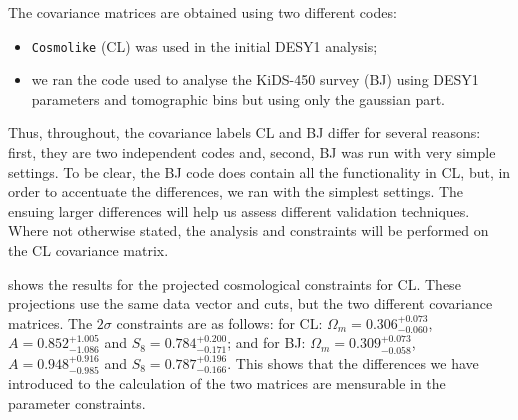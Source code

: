 \documentclass[twocolumn]{\docclass}
\newcommand\scott[1]{{\bf [Scott: #1]}}
\begin{document}
	The covariance matrices are obtained using two different codes: 
	\begin{itemize}
		\item {\tt Cosmolike} \citep{Krause:2016jvl} (CL) was used in the initial DESY1 analysis;
		\item we ran the code used to analyse the KiDS-450 survey \citep{Kohlinger:2017sxk} (BJ) using DESY1 parameters and tomographic bins but using only the gaussian part. 
	\end{itemize}
	Thus, throughout, the covariance labels CL and BJ differ for several reasons: first, they are two independent codes and, second, BJ was run with very simple settings. To be clear, the BJ code does contain all the functionality in CL, but, in order to accentuate the differences, we ran with the simplest settings. The ensuing larger differences will help us assess different validation techniques. Where not otherwise stated, the analysis and constraints will be performed on the CL covariance matrix.
	
	 shows the results for the projected cosmological constraints for CL. These projections use the same data vector and cuts, but the two different covariance matrices. The $2\sigma$ constraints are as follows: for CL: $\Omega_m= 0.306^{+ 0.073}_{- 0.060}$, $A = 0.852^{+ 1.005}_{- 1.086}$ and $S_8 = 0.784^{+ 0.200}_{- 0.171}$; and for BJ: $\Omega_m = 0.309^{+ 0.073}_{- 0.058}$, 	$A = 0.948^{+ 0.916}_{- 0.985}$ and $S_8 = 0.787^{+ 0.196}_{- 0.166}$. This shows that the differences we have introduced to the calculation of the two matrices are mensurable in the parameter constraints.
	
\end{document}
